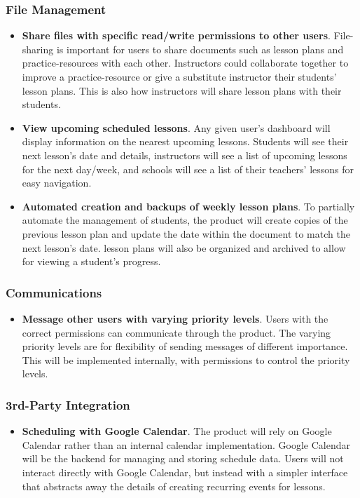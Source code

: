         \subsubsection{File Management}\label{sec:file-management-functions}
            \begin{itemize}                
                \item \textbf{Share files with specific read/write permissions to other users}. File-sharing is important for users to share documents such as \glspl{lesson plan} and \glspl{practice-resource} with each other. Instructors could collaborate together to improve a \gls{practice-resource} or give a substitute instructor their students' \glspl{lesson plan}. This is also how instructors will share \glspl{lesson plan} with their students.
                \item \textbf{View upcoming scheduled lessons}. Any given user's dashboard will display information on the nearest upcoming lessons. Students will see their next lesson's date and details, instructors will see a list of upcoming lessons for the next day/week, and schools will see a list of their teachers' lessons for easy navigation.
                \item \textbf{Automated creation and backups of weekly \glspl{lesson plan}}. To partially automate the management of students, the product will create copies of the previous \gls{lesson plan} and update the date within the document to match the next lesson's date. \Glspl{lesson plan} will also be organized and archived to allow for viewing a student's progress.
            \end{itemize}
        \subsubsection{Communications}\label{sec:communications-functions}
            \begin{itemize}
                \item \textbf{Message other users with varying priority levels}. Users with the correct permissions can communicate through the product. The varying priority levels are for flexibility of sending messages of different importance. This will be implemented internally, with permissions to control the priority levels. 
            \end{itemize}
        \subsubsection{3rd-Party Integration}\label{sec:3rd-party-integration-functions}
            \begin{itemize}                
                \item \textbf{Scheduling with Google Calendar}. The product will rely on Google Calendar rather than an internal calendar implementation. Google Calendar will be the backend for managing and storing schedule data. Users will not interact directly with Google Calendar, but instead with a simpler interface that abstracts away the details of creating recurring events for lessons.
            \end{itemize}
